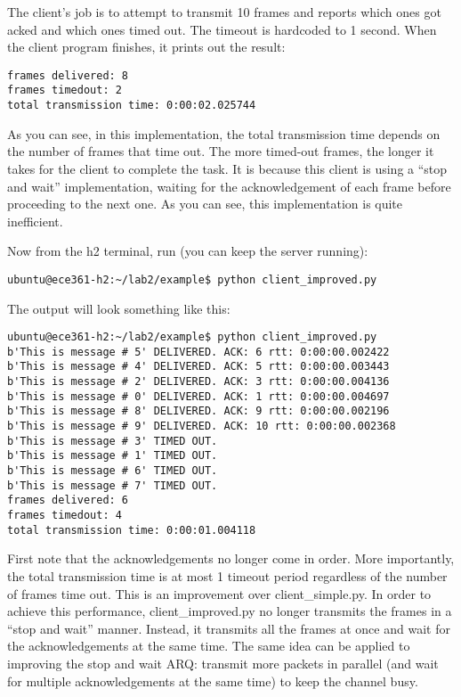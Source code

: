 \documentclass[11pt]{article}
\begin{document}
The client's job is to attempt to transmit 10 frames and reports which ones got acked and which ones timed out. The timeout is hardcoded to 1 second. When the client program finishes, it prints out the result:
\begin{lstlisting}[style=ece361shell, caption={}]
frames delivered: 8
frames timedout: 2
total transmission time: 0:00:02.025744
\end{lstlisting}
As you can see, in this implementation, the total transmission time depends on the number of frames that time out. The more timed-out frames, the longer it takes for the client to complete the task. It is because this client is using a ``stop and wait'' implementation, waiting for the acknowledgement of each frame before proceeding to the next one. As you can see, this implementation is quite inefficient.

Now from the h2 terminal, run (you can keep the server running):
\begin{lstlisting}[style=ece361shell, caption={}]
ubuntu@ece361-h2:~/lab2/example$ python client_improved.py
\end{lstlisting}

The output will look something like this:
\begin{lstlisting}[style=ece361shell, caption={}]
ubuntu@ece361-h2:~/lab2/example$ python client_improved.py
b'This is message # 5' DELIVERED. ACK: 6 rtt: 0:00:00.002422
b'This is message # 4' DELIVERED. ACK: 5 rtt: 0:00:00.003443
b'This is message # 2' DELIVERED. ACK: 3 rtt: 0:00:00.004136
b'This is message # 0' DELIVERED. ACK: 1 rtt: 0:00:00.004697
b'This is message # 8' DELIVERED. ACK: 9 rtt: 0:00:00.002196
b'This is message # 9' DELIVERED. ACK: 10 rtt: 0:00:00.002368
b'This is message # 3' TIMED OUT.
b'This is message # 1' TIMED OUT.
b'This is message # 6' TIMED OUT.
b'This is message # 7' TIMED OUT.
frames delivered: 6
frames timedout: 4
total transmission time: 0:00:01.004118
\end{lstlisting}

First note that the acknowledgements no longer come in order. More importantly, the total transmission time is at most 1 timeout period regardless of the number of frames time out. This is an improvement over client\_simple.py. In order to achieve this performance, client\_improved.py no longer transmits the frames in a ``stop and wait'' manner. Instead, it transmits all the frames at once and wait for the acknowledgements at the same time. The same idea can be applied to improving the stop and wait ARQ: transmit more packets in parallel (and wait for multiple acknowledgements at the same time) to keep the channel busy.
\end{document}
